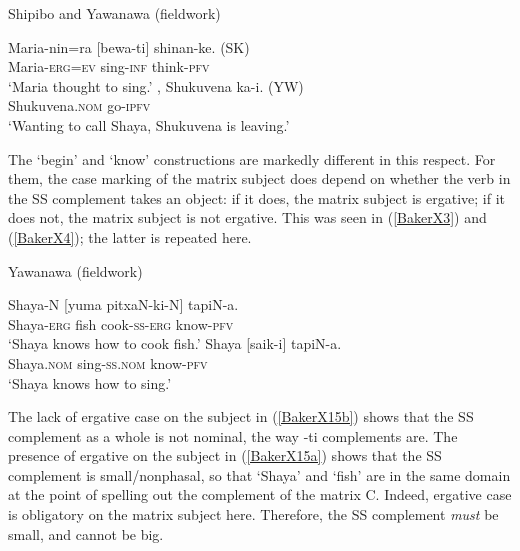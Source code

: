 \documentclass[output=paper,colorlinks,citecolor=brown,
]{langscibook}
\renewcommand{\sc}[1]{\textsc{#1}}
\begin{document}
\begin{exe}
    \ex Shipibo and Yawanawa (fieldwork) \label{BakerX14}
        \begin{xlist}
        \ex \label{BakerX14a}
			\gll Maria-nin=ra [bewa-ti] shinan-ke. (SK)\\
    			 Maria-\sc{erg=ev} sing-\sc{inf} think-\sc{pfv}\\
			    \glt `Maria thought to sing.'
		\ex \label{BakerX14b}
			, Shukuvena ka-i. (YW)\\
    			 [(he) Shaya call-\sc{des-ss.nom}] Shukuvena.\sc{nom} go-\sc{ipfv}\\
			    \glt `Wanting to call Shaya, Shukuvena is leaving.'
        \end{xlist}
\end{exe}

The `begin' and `know' constructions are markedly different in this respect. For them, the case marking of the matrix subject does depend on whether the verb in the SS complement takes an object: if it does, the matrix subject is ergative; if it does not, the matrix subject is not ergative. This was seen in (\ref{BakerX3}) and (\ref{BakerX4}); the latter is repeated here.

\begin{exe}
    \ex Yawanawa (fieldwork) \label{BakerX15}
	    \begin{xlist}
			\ex \label{BakerX15a}
			\gll Shaya-N [yuma pitxaN-ki-N] tapiN-a.\\
			     Shaya-\sc{erg} fish cook-\sc{ss-erg} know-\sc{pfv}\\
			    \glt `Shaya knows how to cook fish.'
			\ex \label{BakerX15b}
			\gll Shaya [saik-i] tapiN-a.\\
    			 Shaya.\sc{nom} sing-\sc{ss.nom} know-\sc{pfv}\\
			    \glt `Shaya knows how to sing.'
		\end{xlist}
\end{exe}


The lack of ergative case on the subject in (\ref{BakerX15b}) shows that the SS complement as a whole is not nominal, the way -ti complements are. The presence of ergative on the subject in (\ref{BakerX15a}) shows that the SS complement is small/nonphasal, so that ‘Shaya’ and ‘fish’ are in the same domain at the point of spelling out the complement of the matrix C. Indeed, ergative case is obligatory on the matrix subject here. Therefore, the SS complement \textit{must} be small, and cannot be big.\\
\end{document}
